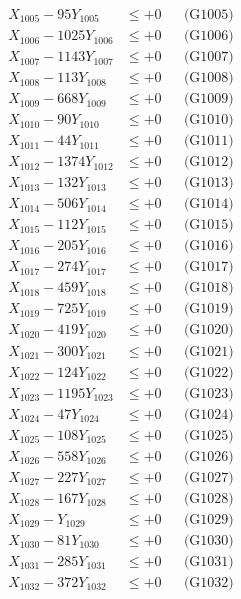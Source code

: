 \documentclass[a4paper,10pt]{article}
\begin{document}
{\begin{align}
X_{1005} - 95Y_{1005} &\leq +0 && \text{(G1005)} \\
X_{1006} - 1025Y_{1006} &\leq +0 && \text{(G1006)} \\
X_{1007} - 1143Y_{1007} &\leq +0 && \text{(G1007)} \\
X_{1008} - 113Y_{1008} &\leq +0 && \text{(G1008)} \\
X_{1009} - 668Y_{1009} &\leq +0 && \text{(G1009)} \\
X_{1010} - 90Y_{1010} &\leq +0 && \text{(G1010)} \\
\allowbreak
X_{1011} - 44Y_{1011} &\leq +0 && \text{(G1011)} \\
X_{1012} - 1374Y_{1012} &\leq +0 && \text{(G1012)} \\
X_{1013} - 132Y_{1013} &\leq +0 && \text{(G1013)} \\
X_{1014} - 506Y_{1014} &\leq +0 && \text{(G1014)} \\
X_{1015} - 112Y_{1015} &\leq +0 && \text{(G1015)} \\
X_{1016} - 205Y_{1016} &\leq +0 && \text{(G1016)} \\
X_{1017} - 274Y_{1017} &\leq +0 && \text{(G1017)} \\
X_{1018} - 459Y_{1018} &\leq +0 && \text{(G1018)} \\
X_{1019} - 725Y_{1019} &\leq +0 && \text{(G1019)} \\
X_{1020} - 419Y_{1020} &\leq +0 && \text{(G1020)} \\
\allowbreak
X_{1021} - 300Y_{1021} &\leq +0 && \text{(G1021)} \\
X_{1022} - 124Y_{1022} &\leq +0 && \text{(G1022)} \\
X_{1023} - 1195Y_{1023} &\leq +0 && \text{(G1023)} \\
X_{1024} - 47Y_{1024} &\leq +0 && \text{(G1024)} \\
X_{1025} - 108Y_{1025} &\leq +0 && \text{(G1025)} \\
X_{1026} - 558Y_{1026} &\leq +0 && \text{(G1026)} \\
X_{1027} - 227Y_{1027} &\leq +0 && \text{(G1027)} \\
X_{1028} - 167Y_{1028} &\leq +0 && \text{(G1028)} \\
X_{1029} - Y_{1029} &\leq +0 && \text{(G1029)} \\
X_{1030} - 81Y_{1030} &\leq +0 && \text{(G1030)} \\
\allowbreak
X_{1031} - 285Y_{1031} &\leq +0 && \text{(G1031)} \\
X_{1032} - 372Y_{1032} &\leq +0 && \text{(G1032)} \\

\end{align}}
\end{document}
